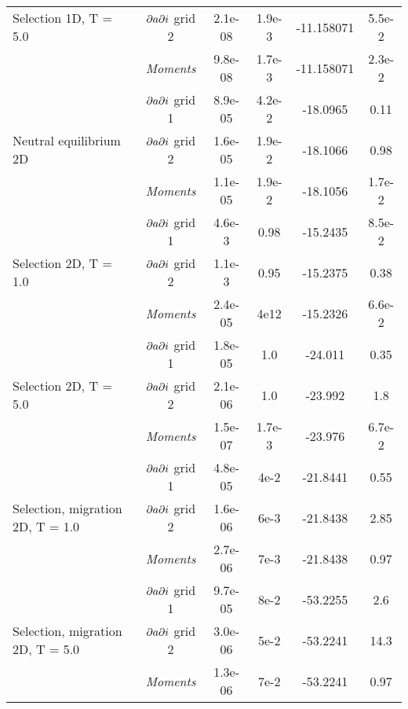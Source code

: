 \begin{table}[h!]
\begin{scriptsize}
\begin{tabular}{l|c|*{4}{c}}
Selection 1D, T = 5.0   & $\partial a \partial i$ grid 2 & 2.1e-08 & 1.9e-3 & -11.158071 & 5.5e-2  \\
 				   & \textit{Moments} & 9.8e-08 & 1.7e-3 & -11.158071 & 2.3e-2  \\
\hline
 				   & $\partial a \partial i$ grid 1 & 8.9e-05 & 4.2e-2 & -18.0965 & 0.11 \\
Neutral equilibrium 2D & $\partial a \partial i$ grid 2 & 1.6e-05 & 1.9e-2 & -18.1066 & 0.98  \\
 				   & \textit{Moments} & 1.1e-05 & 1.9e-2 & -18.1056 & 1.7e-2  \\
\hline
 				   & $\partial a \partial i$ grid 1 & 4.6e-3 & 0.98 & -15.2435 & 8.5e-2  \\
Selection 2D, T = 1.0   & $\partial a \partial i$ grid 2 & 1.1e-3 & 0.95 & -15.2375 &  0.38 \\
 				   & \textit{Moments} & 2.4e-05 & 4e12 & -15.2326 & 6.6e-2  \\
\hline
 				   & $\partial a \partial i$ grid 1 & 1.8e-05 & 1.0 & -24.011 & 0.35 \\
Selection 2D, T = 5.0   & $\partial a \partial i$ grid 2 & 2.1e-06 & 1.0 & -23.992 & 1.8  \\
 				   & \textit{Moments} & 1.5e-07 & 1.7e-3 & -23.976 & 6.7e-2  \\
\hline
 				   		   & $\partial a \partial i$ grid 1 & 4.8e-05 & 4e-2 & -21.8441 & 0.55  \\
Selection, migration 2D, T = 1.0   & $\partial a \partial i$ grid 2 & 1.6e-06 & 6e-3 & -21.8438 & 2.85 \\
 				   		   & \textit{Moments} & 2.7e-06 & 7e-3 & -21.8438 & 0.97  \\
\hline
 				   		   & $\partial a \partial i$ grid 1 & 9.7e-05 & 8e-2 & -53.2255 & 2.6  \\
Selection, migration 2D, T = 5.0   & $\partial a \partial i$ grid 2 & 3.0e-06 & 5e-2 & -53.2241 & 14.3  \\
 				   		   & \textit{Moments} & 1.3e-06 & 7e-2 & -53.2241 & 0.97  \\
\hline


\end{tabular}
\end{scriptsize}
\end{table}
